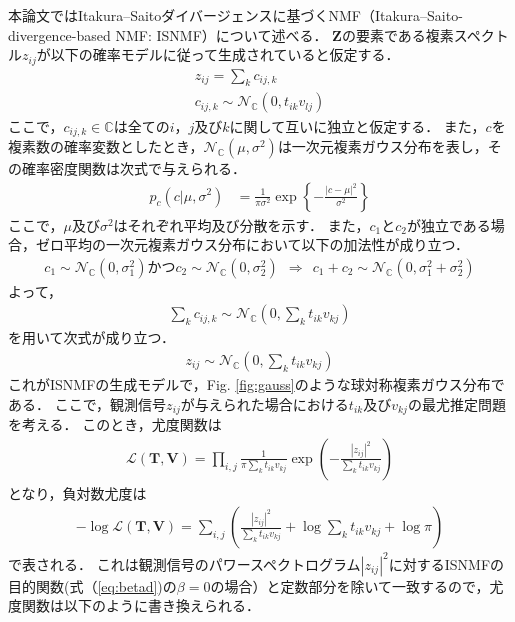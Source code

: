本論文ではItakura--Saitoダイバージェンスに基づくNMF（Itakura--Saito-divergence-based NMF: ISNMF）\cite{isnmf}について述べる．
$\bm{Z}$の要素である複素スペクトル$z_{ij}$が以下の確率モデルに従って生成されていると仮定する．
\begin{align}
    z_{ij} = \sum_k c_{ij,k} \\
    c_{ij,k} \sim \mathcal{N}_{\mathbb{C}} (0, t_{ik}v_{lj})
\end{align}
ここで，$c_{ij,k} \in \mathbb{C}$は全ての$i$，$j$及び$k$に関して互いに独立と仮定する．
また，$c$を複素数の確率変数としたとき，$\mathcal{N}_{\mathbb{C}} (\mu, \sigma^2)$は一次元複素ガウス分布を表し，その確率密度関数は次式で与えられる．
\begin{align}
    p_c(c | \mu, \sigma^2) &= \frac{1}{\pi \sigma^2} \exp \left\{ -\frac{|c-\mu|^2}{\sigma^2} \right\}
\end{align}
ここで，$\mu$及び$\sigma^2$はそれぞれ平均及び分散を示す．
また，$c_1$と$c_2$が独立である場合，ゼロ平均の一次元複素ガウス分布において以下の加法性が成り立つ．
\begin{align}
    c_1 \sim \mathcal{N}_{\mathbb{C}}(0,\sigma_1^2)かつc_2 \sim \mathcal{N}_{\mathbb{C}}(0,\sigma_2^2) ~~ \Longrightarrow ~~ c_1 + c_2 \sim \mathcal{N}_{\mathbb{C}}(0,\sigma_1^2 + \sigma_2^2)
\end{align}
よって，
\begin{align}
    \sum_k c_{ij,k} \sim \mathcal{N}_{\mathbb{C}}\left( 0, \sum_k t_{ik} v_{kj} \right)
\end{align}
を用いて次式が成り立つ．
\begin{align}
    z_{ij} \sim \mathcal{N}_{\mathbb{C}}\left( 0, \sum_k t_{ik} v_{kj} \right) \label{eq:nmfgen}
\end{align}
これがISNMFの生成モデルで，Fig. \ref{fig:gauss}のような球対称複素ガウス分布である．
ここで，観測信号$z_{ij}$が与えられた場合における$t_{ik}$及び$v_{kj}$の最尤推定問題を考える．
このとき，尤度関数は
\begin{align}
    \mathcal{L}(\bm{T}, \bm{V}) = \prod_{i,j} \frac{1}{\pi \sum_k t_{ik} v_{kj} } \exp \left( -\frac{|z_{ij}|^2}{\sum_k t_{ik} v_{kj}} \right)
\end{align}
となり，負対数尤度は
\begin{align}
    -\log\mathcal{L}(\bm{T}, \bm{V}) = \sum_{i,j} \left( \frac{|z_{ij}|^2}{\sum_k t_{ik} v_{kj}} + \log \sum_k t_{ik} v_{kj} + \log \pi \right)
\end{align}
で表される．
これは観測信号のパワースペクトログラム$|z_{ij}|^2$に対するISNMFの目的関数(式（\ref{eq:betad})の$\beta = 0$の場合）と定数部分を除いて一致するので，尤度関数は以下のように書き換えられる．
